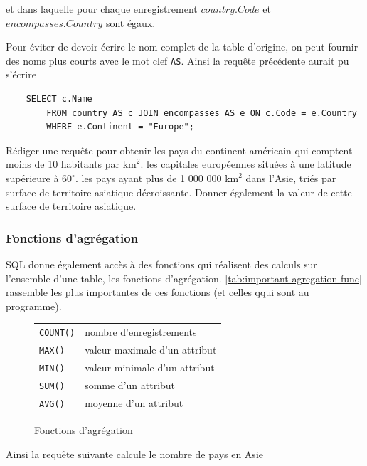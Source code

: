 et dans laquelle pour chaque enregistrement $ country.Code $ et $ encompasses.Country $ sont égaux.

Pour éviter de devoir écrire le nom complet de la table d'origine, on peut fournir des noms plus courts avec le mot clef \texttt{AS}. Ainsi la requête précédente aurait pu s'écrire

\begin{verbatim}
    SELECT c.Name
        FROM country AS c JOIN encompasses AS e ON c.Code = e.Country
        WHERE e.Continent = "Europe";
\end{verbatim}

\ques Rédiger une requête pour obtenir
\ssques les pays du continent américain qui comptent moins de 10 habitants par $ \textrm{km}^2 $.
\ssques les capitales européennes situées à une latitude supérieure à $ 60^{\circ} $.
\ssques les pays ayant plus de 1 000 000 $ \textrm{km}^2 $ dans l'Asie, triés par surface de territoire asiatique décroissante. Donner également la valeur de cette surface de territoire asiatique.

\subsubsection{Fonctions d'agrégation}

SQL donne également accès à des fonctions qui réalisent des calculs sur l'ensemble d'une table, les fonctions d'agrégation. \autoref{tab:important-agregation-func} rassemble les plus importantes de ces fonctions (et celles qqui sont au programme).

\begin{figure}[h!]
	\centering
	\begin{tabular}{|ll|}
		\hline
		\texttt{COUNT()} & nombre d'enregistrements      \\
		\texttt{MAX()}   & valeur maximale d'un attribut \\
		\texttt{MIN()}   & valeur minimale d'un attribut \\
		\texttt{SUM()}   & somme d'un attribut           \\
		\texttt{AVG()}   & moyenne d'un attribut         \\
		\hline
	\end{tabular}
	\caption{Fonctions d'agrégation}
	\label{tab:important-agregation-func}
\end{figure}

Ainsi la requête suivante calcule le nombre de pays en Asie

